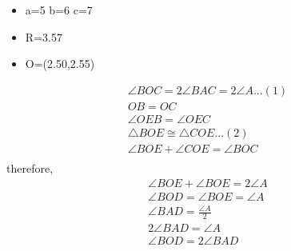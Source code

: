 \begin{frame}
\begin{itemize}
\item a=5 b=6 c=7
\item R=3.57
\item O=(2.50,2.55)
\end{itemize}
\end{frame}
\begin{frame}
\begin{align*}
\angle{BOC}= 2\angle{BAC}=2\angle{A} ...(1)\\
OB=OC\\
\angle{OEB}=\angle{OEC}\\
\triangle{BOE} \cong \triangle{COE}  ...(2)\\
\angle{BOE}+\angle{COE}=\angle{BOC}\\
\end{align*}
therefore,
\begin{align*}
\angle{BOE}+\angle{BOE}=2\angle{A}\\
\angle{BOD}=\angle{BOE}=\angle{A}\\
\angle{BAD}=\frac{\angle{A}}{2}\\
2\angle{BAD}=\angle{A}\\
\angle{BOD}=2\angle{BAD}\\
\end{align*}
\end{frame}
